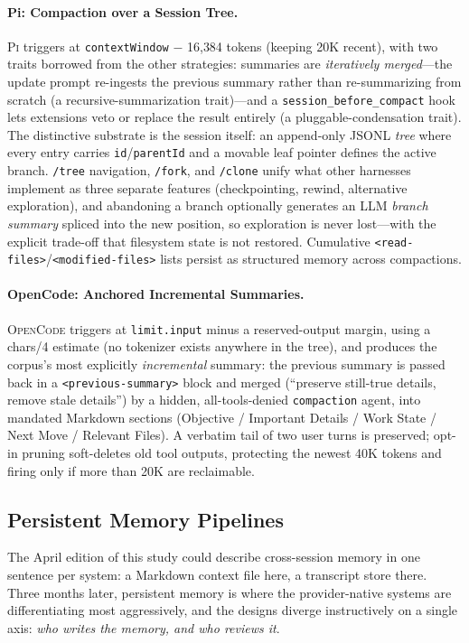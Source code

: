 \documentclass[11pt,a4paper]{article}
\newcommand{\pib}{\textsc{Pi}\xspace}
\newcommand{\ocd}{\textsc{OpenCode}\xspace}
\begin{document}
\paragraph{Pi: Compaction over a Session Tree.}
\pib{} triggers at \texttt{contextWindow} $-$ 16{,}384 tokens (keeping 20K recent), with two traits borrowed from the other strategies: summaries are \emph{iteratively merged}---the update prompt re-ingests the previous summary rather than re-summarizing from scratch (a recursive-summarization trait)---and a \texttt{session\_before\_compact} hook lets extensions veto or replace the result entirely (a pluggable-condensation trait).
The distinctive substrate is the session itself: an append-only JSONL \emph{tree} where every entry carries \texttt{id}/\texttt{parentId} and a movable leaf pointer defines the active branch.
\texttt{/tree} navigation, \texttt{/fork}, and \texttt{/clone} unify what other harnesses implement as three separate features (checkpointing, rewind, alternative exploration), and abandoning a branch optionally generates an LLM \emph{branch summary} spliced into the new position, so exploration is never lost---with the explicit trade-off that filesystem state is not restored.
Cumulative \texttt{<read-files>}/\texttt{<modified-files>} lists persist as structured memory across compactions.

\paragraph{OpenCode: Anchored Incremental Summaries.}
\ocd{} triggers at \texttt{limit.input} minus a reserved-output margin, using a chars/4 estimate (no tokenizer exists anywhere in the tree), and produces the corpus's most explicitly \emph{incremental} summary: the previous summary is passed back in a \texttt{<previous-summary>} block and merged (``preserve still-true details, remove stale details'') by a hidden, all-tools-denied \texttt{compaction} agent, into mandated Markdown sections (Objective / Important Details / Work State / Next Move / Relevant Files).
A verbatim tail of two user turns is preserved; opt-in pruning soft-deletes old tool outputs, protecting the newest 40K tokens and firing only if more than 20K are reclaimable.

\subsection{Persistent Memory Pipelines}
\label{sec:memory_pipelines}

The April edition of this study could describe cross-session memory in one sentence per system: a Markdown context file here, a transcript store there.
Three months later, persistent memory is where the provider-native systems are differentiating most aggressively, and the designs diverge instructively on a single axis: \emph{who writes the memory, and who reviews it}.
\end{document}
